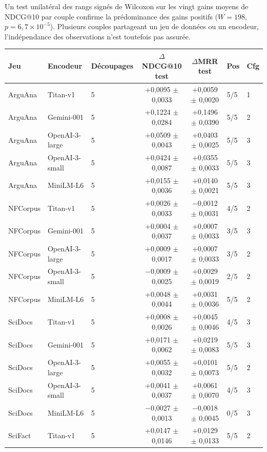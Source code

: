 \documentclass[a4paper,10pt]{article}
\begin{document}
Un test unilatéral des rangs signés de Wilcoxon sur les vingt gains moyens de NDCG@10 par couple confirme la prédominance des gains positifs ($W=198$, $p=6{,}7\times10^{-5}$). Plusieurs couples partageant un jeu de données ou un encodeur, l'indépendance des observations n'est toutefois pas assurée.

\begin{table}[p]
\centering
\small
\begin{tabular}{lllccll}
\toprule
Jeu & Encodeur & Découpages & $\Delta$NDCG@10 test & $\Delta$MRR test & Pos & Cfg \\
\midrule
ArguAna & Titan-v1 & 5 & +0,0095 $\pm$ 0,0033 & +0,0059 $\pm$ 0,0020 & 5/5 & 1 \\
ArguAna & Gemini-001 & 5 & +0,1224 $\pm$ 0,0284 & +0,1496 $\pm$ 0,0390 & 5/5 & 2 \\
ArguAna & OpenAI-3-large & 5 & +0,0509 $\pm$ 0,0043 & +0,0403 $\pm$ 0,0025 & 5/5 & 3 \\
ArguAna & OpenAI-3-small & 5 & +0,0424 $\pm$ 0,0087 & +0,0355 $\pm$ 0,0033 & 5/5 & 3 \\
ArguAna & MiniLM-L6 & 5 & +0,0155 $\pm$ 0,0036 & +0,0140 $\pm$ 0,0021 & 5/5 & 3 \\
\midrule
NFCorpus & Titan-v1 & 5 & +0,0026 $\pm$ 0,0033 & $-$0,0012 $\pm$ 0,0031 & 4/5 & 2 \\
NFCorpus & Gemini-001 & 5 & +0,0004 $\pm$ 0,0037 & +0,0007 $\pm$ 0,0033 & 3/5 & 3 \\
NFCorpus & OpenAI-3-large & 5 & +0,0009 $\pm$ 0,0017 & +0,0007 $\pm$ 0,0033 & 3/5 & 2 \\
NFCorpus & OpenAI-3-small & 5 & $-$0,0009 $\pm$ 0,0025 & +0,0029 $\pm$ 0,0019 & 2/5 & 2 \\
NFCorpus & MiniLM-L6 & 5 & +0,0048 $\pm$ 0,0044 & +0,0031 $\pm$ 0,0036 & 5/5 & 2 \\
\midrule
SciDocs & Titan-v1 & 5 & +0,0008 $\pm$ 0,0026 & +0,0045 $\pm$ 0,0046 & 4/5 & 3 \\
SciDocs & Gemini-001 & 5 & +0,0171 $\pm$ 0,0062 & +0,0219 $\pm$ 0,0083 & 5/5 & 3 \\
SciDocs & OpenAI-3-large & 5 & +0,0055 $\pm$ 0,0032 & +0,0101 $\pm$ 0,0073 & 5/5 & 2 \\
SciDocs & OpenAI-3-small & 5 & +0,0041 $\pm$ 0,0037 & +0,0061 $\pm$ 0,0070 & 4/5 & 3 \\
SciDocs & MiniLM-L6 & 5 & $-$0,0027 $\pm$ 0,0013 & $-$0,0018 $\pm$ 0,0045 & 0/5 & 3 \\
\midrule
SciFact & Titan-v1 & 5 & +0,0147 $\pm$ 0,0146 & +0,0129 $\pm$ 0,0133 & 5/5 & 2 \\

\end{tabular}
\end{table}
\end{document}
